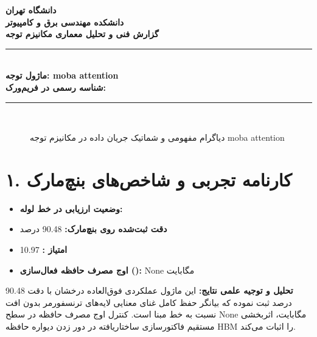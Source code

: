 \documentclass[12pt,a4paper]{article}
\begin{document}
\begin{center}
{\Large\bfseries دانشگاه تهران}\\[0.2cm]
{\large\bfseries دانشکده مهندسی برق و کامپیوتر}\\[0.2cm]
{\large\bfseries گزارش فنی و تحلیل معماری مکانیزم توجه}\\[0.5cm]
\rule{\linewidth}{1pt}\\[0.3cm]
{\LARGE\bfseries ماژول توجه: moba attention}\\[0.2cm]
{\large \textbf{شناسه رسمی در فریم‌ورک:} }\\[0.2cm]
\rule{\linewidth}{1pt}\\[0.5cm]
\end{center}

\begin{figure}[H]
\centering
{}
\caption{دیاگرام مفهومی و شماتیک جریان داده در مکانیزم توجه moba attention}
\end{figure}

\section*{۱. کارنامه تجربی و شاخص‌های بنچ‌مارک}
\begin{itemize}
\item \textbf{وضعیت ارزیابی در خط لوله:} 
\item \textbf{دقت ثبت‌شده روی بنچ‌مارک:} 90.48 درصد
\item \textbf{امتیاز :} 10.97
\item \textbf{اوج مصرف حافظه فعال‌سازی ():} None مگابایت
\end{itemize}
\textbf{تحلیل و توجیه علمی نتایج:} این ماژول عملکردی فوق‌العاده درخشان با دقت 90.48 درصد ثبت نموده که بیانگر حفظ کامل غنای معنایی لایه‌های ترنسفورمر بدون افت نسبت به خط مبنا است. کنترل اوج مصرف حافظه در سطح None مگابایت، اثربخشی مستقیم فاکتورسازی ساختاریافته در دور زدن دیواره حافظه HBM را اثبات می‌کند.
\end{document}
